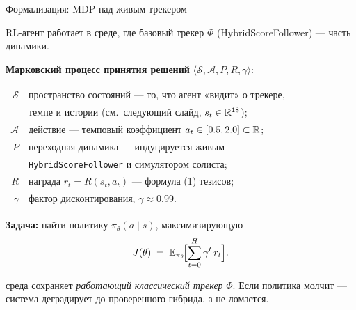 \begin{frame}{Формализация: MDP над живым трекером}

RL-агент работает в среде, где базовый трекер $\Phi$
(HybridScoreFollower) --- часть динамики.

\bigskip

\textbf{Марковский процесс принятия решений}
$\langle \mathcal{S}, \mathcal{A}, P, R, \gamma \rangle$:

\bigskip

\small\begin{tabular}{rl}
$\mathcal{S}$ & пространство состояний --- то, что агент «видит» о трекере,\\
              & темпе и истории (см.\ следующий слайд, $s_t \in \mathbb{R}^{18}$);\\[0.3em]
$\mathcal{A}$ & действие --- темповый коэффициент $a_t \in [0.5, 2.0] \subset \mathbb{R}$;\\[0.3em]
$P$           & переходная динамика --- индуцируется живым\\
              & \texttt{HybridScoreFollower} и симулятором солиста;\\[0.3em]
$R$           & награда $r_t = R(s_t, a_t)$ --- формула (1) тезисов;\\[0.3em]
$\gamma$      & фактор дисконтирования, $\gamma \approx 0.99$.
\end{tabular}\normalsize

\bigskip

\textbf{Задача:} найти политику $\pi_\theta(a \mid s)$, максимизирующую
\[
J(\theta) \;=\; \mathbb{E}_{\pi_\theta}\!\Bigl[\sum_{t=0}^{H} \gamma^t\, r_t\Bigr].
\]


\small{} среда сохраняет
\emph{работающий классический трекер} $\Phi$. Если политика молчит ---
система деградирует до проверенного гибрида, а не ломается.

\end{frame}
